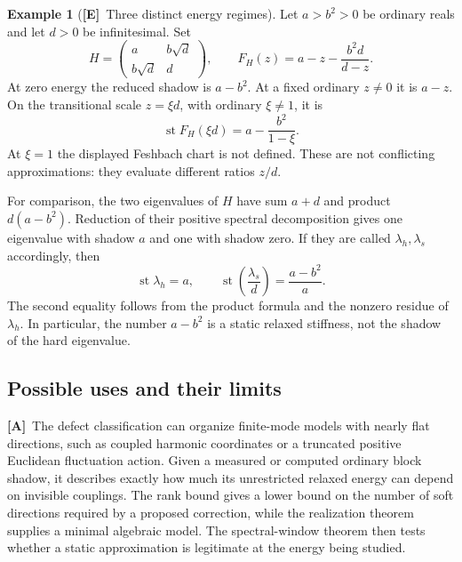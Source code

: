 \documentclass[11pt,oneside]{article}
\numberwithin{equation}{section}
\theoremstyle{plain}
\theoremstyle{definition}
\newtheorem{example}[example]{Example}
\theoremstyle{remark}
\DeclareMathOperator{\st}{st}
\newcommand{\TE}{\textcolor{TierE}{\textsf{\bfseries[E]}}}
\newcommand{\TA}{\textcolor{TierA}{\textsf{\bfseries[A]}}}
\begin{document}
\begin{example}[\TE\ Three distinct energy regimes]\label{qgs:ops:ex:three-regimes}
Let $a>b^2>0$ be ordinary reals and let $d>0$ be infinitesimal. Set
\begin{equation}\label{qgs:ops:eq:two-level-soft}
 H=\begin{pmatrix}a&b\sqrt d\\b\sqrt d&d\end{pmatrix},\qquad
 F_H(z)=a-z-\frac{b^2d}{d-z}.
\end{equation}
At zero energy the reduced shadow is $a-b^2$. At a fixed ordinary $z\ne0$ it is $a-z$. On the transitional scale $z=\xi d$, with ordinary $\xi\ne1$, it is
\begin{equation}\label{qgs:ops:eq:transition}
 \st F_H(\xi d)=a-\frac{b^2}{1-\xi}.
\end{equation}
At $\xi=1$ the displayed Feshbach chart is not defined. These are not conflicting approximations: they evaluate different ratios $z/d$.

For comparison, the two eigenvalues of $H$ have sum $a+d$ and product $d(a-b^2)$. Reduction of their positive spectral decomposition gives one eigenvalue with shadow $a$ and one with shadow zero. If they are called $\lambda_h,\lambda_s$ accordingly, then
\begin{equation}\label{qgs:ops:eq:soft-eigenvalue}
 \st\lambda_h=a,\qquad
 \st\left(\frac{\lambda_s}{d}\right)=\frac{a-b^2}{a}.
\end{equation}
The second equality follows from the product formula and the nonzero residue of $\lambda_h$. In particular, the number $a-b^2$ is a static relaxed stiffness, not the shadow of the hard eigenvalue.
\end{example}

\subsection{Possible uses and their limits}
\TA\ The defect classification can organize finite-mode models with nearly flat directions, such as coupled harmonic coordinates or a truncated positive Euclidean fluctuation action. Given a measured or computed ordinary block shadow, it describes exactly how much its unrestricted relaxed energy can depend on invisible couplings. The rank bound gives a lower bound on the number of soft directions required by a proposed correction, while the realization theorem supplies a minimal algebraic model. The spectral-window theorem then tests whether a static approximation is legitimate at the energy being studied.
\end{document}
